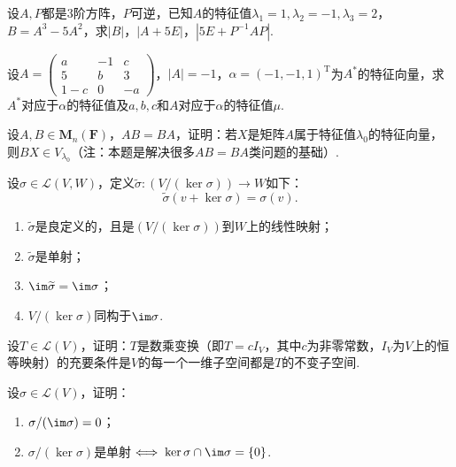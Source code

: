 \begin{exercise}
\begin{exgroup}
        \item 设$A,P$都是3阶方阵，$P$可逆，已知$A$的特征值$\lambda_1=1,\lambda_2=-1,\lambda_3=2$，$B=A^3-5A^2$，求$|B|$，$|A+5E|$，$|5E+P^{-1}AP|$.

        \item 设$A=\begin{pmatrix}
                a & -1 & c \\ 5 & b & 3 \\ 1-c & 0 & -a
            \end{pmatrix}$，$|A|=-1$，$\alpha=(-1,-1,1)^\mathrm{T}$为$A^*$的特征向量，求$A^*$对应于$\alpha$的特征值及$a,b,c$和$A$对应于$\alpha$的特征值$\mu$.

        \item 设$A,B\in \mathbf{M}_n(\mathbf{F})$，$AB=BA$，证明：若$X$是矩阵$A$属于特征值$\lambda_0$的特征向量，则$BX\in V_{\lambda_0}$（注：本题是解决很多$AB=BA$类问题的基础）.
    \end{exgroup}

    \begin{exgroup}
        \item 设$\sigma\in \mathcal{L}(V,W)$，定义$\widetilde{\sigma}:(V/(\ker \sigma))\to W$如下：
        \[\widetilde{\sigma}(v+\ker\sigma)=\sigma(v).\]
        \begin{enumerate}
            \item $\widetilde{\sigma}$是良定义的，且是$(V/(\ker \sigma))$到$W$上的线性映射；

            \item $\widetilde{\sigma}$是单射；

            \item $\im \widetilde{\sigma}=\im \sigma$；

            \item $V/(\ker \sigma)$同构于$\im \sigma$.
        \end{enumerate}

        \item 设$T\in \mathcal{L}(V)$，证明：$T$是数乘变换（即$T=cI_V$，其中$c$为非零常数，$I_V$为$V$上的恒等映射）的充要条件是$V$的每一个一维子空间都是$T$的不变子空间.

        \item 设$\sigma\in \mathcal{L}(V)$，证明：
        \begin{enumerate}
            \item $\sigma/(\im \sigma)=0$；

            \item $\sigma/(\ker \sigma)$是单射$\iff \ker \sigma\cap\im \sigma=\{0\}$.
        \end{enumerate}


\end{exgroup}
\end{exercise}
